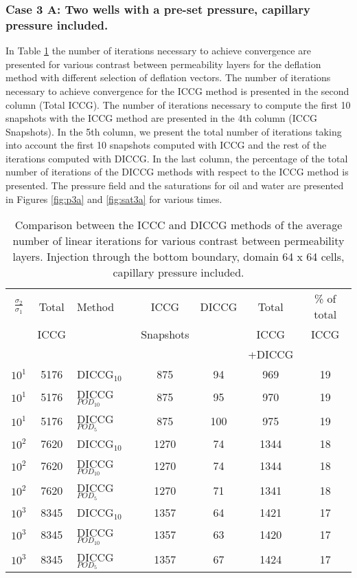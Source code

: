 \documentclass[12pt]{article}
\begin{document}
\subsubsection*{Case 3 A: Two wells with a pre-set pressure, capillary pressure included.}
In Table \ref{table:liter3a} the number of iterations necessary to achieve convergence are presented for various contrast between permeability layers for the deflation method with different selection of deflation vectors. The number of iterations necessary to achieve convergence for the ICCG method is presented in the second column (Total ICCG). The number of iterations necessary to compute the first 10 snapshots with the ICCG method are presented in the 4th column (ICCG Snapshots). In the 5th column, we present the total number of iterations taking into account the first 10 snapshots computed with ICCG and the rest of the iterations computed with DICCG. In the last column, the percentage of the total number of iterations of the DICCG methods with respect to the ICCG method is presented.   
The pressure field and the saturations for oil and water are presented in Figures \ref{fig:p3a} and \ref{fig:sat3a} for various times.
\begin{table}[!h]\centering
\begin{minipage}{1\textwidth}
 \centering
\begin{tabular}{ ||c|c||l|c|c|c|c||} 
\hline
$\frac{\sigma_2}{\sigma_1}$&Total&Method  & ICCG&DICCG &Total&\% of total\\ 
                           & ICCG     &  & Snapshots& &ICCG& ICCG\\ 
                            &     &  & & &+DICCG& \\
\hline 
$10^{1}$ &5176& DICCG$_{10}$&875&94&969&19\\ 
\hline  
$10^{1}$ &5176& DICCG$_{POD_{10}}$&875&95&970&19 \\ 
\hline  
$10^{1}$ &5176& DICCG$_{POD_{5}}$&875&100&975&19 \\ 
\hline
$10^{2}$ &7620& DICCG$_{10}$&1270&74&1344&18\\ 
\hline  
$10^{2}$ &7620& DICCG$_{POD_{10}}$&1270&74&1344&18 \\ 
\hline  
$10^{2}$ &7620& DICCG$_{POD_{5}}$&1270&71&1341&18 \\ 
\hline 
$10^{3}$ &8345& DICCG$_{10}$&1357&64&1421&17\\ 
\hline  
$10^{3}$ &8345& DICCG$_{POD_{10}}$&1357&63&1420&17 \\ 
\hline  
$10^{3}$ &8345& DICCG$_{POD_{5}}$&1357&67&1424&17 \\ 
\hline 
\end{tabular} 
\caption{Comparison between the ICCC and DICCG methods of the average number of linear iterations for various contrast between permeability layers. Injection through the bottom boundary, domain 64 x 64 cells, capillary pressure included.}\label{table:liter3a} 
\end{minipage}  
\end{table}  
\end{document}
